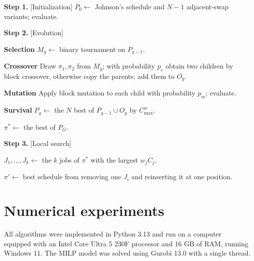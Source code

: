 ﻿\documentclass[12pt]{article} \textheight=24.5cm \textwidth=16.5cm \parskip = 0.165cm
\let\origsection\section
\renewcommand{\section}{\FloatBarrier\origsection}
\begin{document}
\begin{sloppypar}
        \begin{algorithm}[H]
            \small
            \linespread{1.2}\selectfont
            \SetAlgoLined
            \DontPrintSemicolon
            \caption{The weight-block genetic algorithm (WBGA) for $F2 \mid \mid C_{\max}^w$} \label{Alg-GA}
            
            \BlankLine
            \textbf{Step 1.} [Initialization] $P_0\gets$ Johnson's schedule and $N-1$ adjacent-swap variants; evaluate. \;

            \textbf{Step 2.} [Evolution] 
            {
                \textbf{Selection} $M_g\gets$ binary tournament on $P_{g-1}$. \;

                \textbf{Crossover} 
                {
                    Draw $\pi_1,\pi_2$ from $M_g$; with probability $p_c$ obtain two children by block crossover, otherwise copy the parents; add them to $O_g$. \;
                }

                \textbf{Mutation} Apply block mutation to each child with probability $p_m$; evaluate. \;

                \textbf{Survival} $P_g\gets$ the $N$ best of $P_{g-1}\cup O_g$ by $C_{\max}^w$. \;
            }

            $\pi^{*}\gets$ the best of $P_G$. \;

            \textbf{Step 3.} [Local search] 
            {
                $J_1,\ldots,J_k\gets$ the $k$ jobs of $\pi^{*}$ with the largest $w_jC_j$. \;

                $\pi'\gets$ best schedule from removing one $J_i$ and reinserting it at one position. \;

            }
        \end{algorithm}


        \section{Numerical experiments} \label{sec:experiments}


        All algorithms were implemented in Python 3.13 and run on a computer equipped with an Intel Core Ultra 5 230F processor and 16 GB of RAM, running Windows 11.
        The $\mathrm{MILP}$ model was solved using Gurobi 13.0 with a single thread.


\end{sloppypar}
\end{document}
